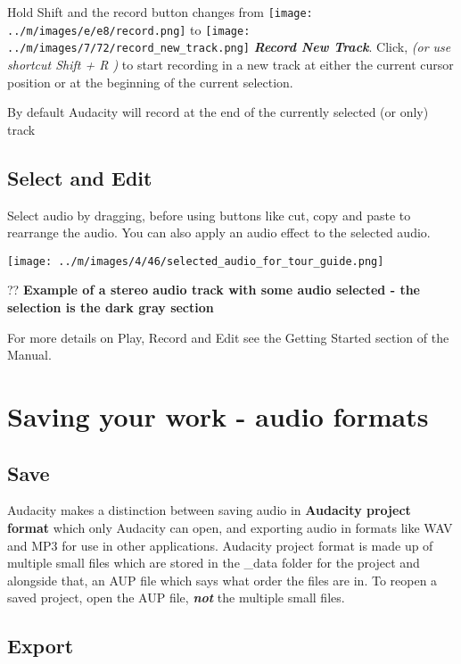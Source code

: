 \documentclass[twocolumn]{book}
\begin{document}
Hold Shift and the record button changes from \texttt{[image: ../m/images/e/e8/record.png]} to \texttt{[image: ../m/images/7/72/record\_new\_track.png]} \textit{\textbf{Record New Track}}.  Click, \textit{(or use shortcut Shift + R )} to start recording in a new track at either the current cursor position or at the beginning of the current selection.

By default Audacity will record at the end of the currently selected (or only) track

\subsection{Select and Edit}


Select audio by dragging, before using buttons like cut, copy and paste to rearrange the audio.  You can also apply an audio effect to the selected audio.\par\texttt{[image: ../m/images/4/46/selected\_audio\_for\_tour\_guide.png]}\par??
\textbf{Example of a stereo audio track with some audio selected - the selection is the dark gray section}

For more details on Play, Record and Edit see the Getting Started section of the Manual.




\section{Saving your work - audio formats}


\subsection{Save}


Audacity makes a distinction between saving audio in \textbf{Audacity project format} which only Audacity can open, and exporting audio in formats like WAV and MP3 for use in other applications. Audacity project format is made up of multiple small files which are stored in the \_data folder for the project and alongside that, an  AUP file which says what order the files are in. To reopen a saved project, open the AUP file, \textit{\textbf{not}} the multiple small files. 

\subsection{Export}
\end{document}
